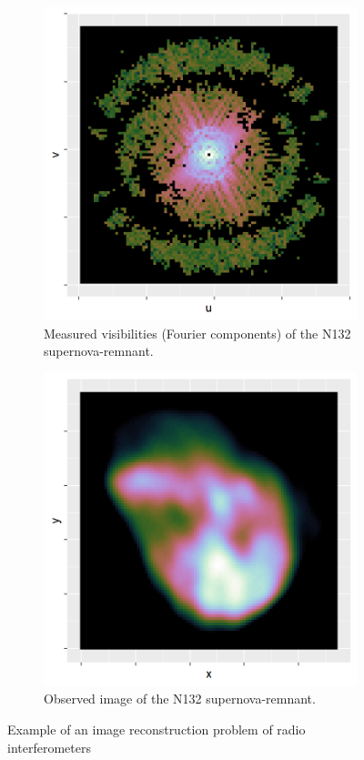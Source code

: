 \begin{figure}[h]
	\centering
	\begin{subfigure}{0.4\linewidth}
		\includegraphics[width=1.0\linewidth]{./chapters/01.intro/reconstruction/CD-N132-FT.png}
		\caption{Measured visibilities (Fourier components) of the N132 supernova-remnant.}
		\label{intro:inversefig:uv}
	\end{subfigure}
	\begin{subfigure}{0.4\linewidth}
		\includegraphics[width=1.0\linewidth]{./chapters/01.intro/reconstruction/CD-N132-naked.png}
		\caption{Observed image of the N132 supernova-remnant.}
		\label{intro:inversefig:rev}
	\end{subfigure}
	\caption{Example of an image reconstruction problem of radio interferometers}
	\label{intro:inversefig}
\end{figure}

